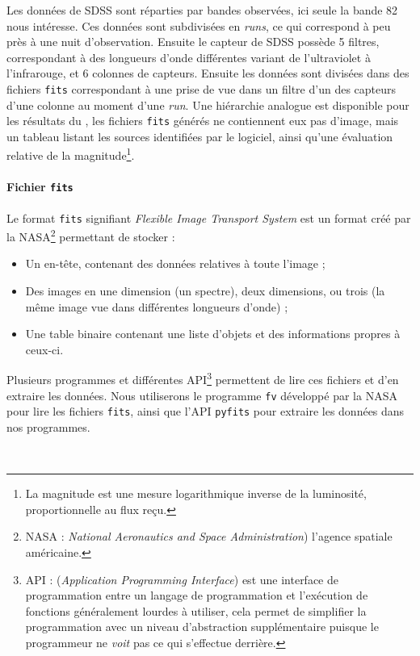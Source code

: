 Les données de SDSS sont réparties par bandes observées, ici seule la bande 82 nous intéresse. Ces données sont subdivisées en \emph{runs}, ce qui correspond à peu près à une nuit d'observation. Ensuite le capteur de SDSS possède 5 filtres, correspondant à des longueurs d'onde différentes variant de l'ultraviolet à l'infrarouge, et 6 colonnes de capteurs. Ensuite les données sont divisées dans des fichiers \texttt{fits} correspondant à une prise de vue dans un filtre d'un des capteurs d'une colonne au moment d'une \emph{run}. Une hiérarchie analogue est disponible pour les résultats du \stack{}, les fichiers \texttt{fits} générés ne contiennent eux pas d'image, mais un tableau listant les sources identifiées par le logiciel, ainsi qu'une évaluation relative de la magnitude\footnote{La magnitude est une mesure logarithmique inverse de la luminosité, proportionnelle au flux reçu.}.

			\paragraph{Fichier \texttt{fits}}
Le format \texttt{fits} signifiant \emph{Flexible Image Transport System} est un format créé par la NASA\footnote{NASA : \emph{National Aeronautics and Space Administration}) l'agence spatiale américaine.} permettant de stocker :
	\begin{itemize}
		\item Un en-tête, contenant des données relatives à toute l'image ;
		\item Des images en une dimension (un spectre), deux dimensions, ou trois (la même image vue dans différentes longueurs d'onde) ;
		\item Une table binaire contenant une liste d'objets et des informations propres à ceux-ci.
	\end{itemize}
Plusieurs programmes et différentes API\footnote{API : (\emph{Application Programming Interface}) est une interface de programmation entre un langage de programmation et l'exécution de fonctions généralement lourdes à utiliser, cela permet de simplifier la programmation avec un niveau d'abstraction supplémentaire puisque le programmeur ne \emph{voit} pas ce qui s'effectue derrière.} permettent de lire ces fichiers et d'en extraire les données. Nous utiliserons le programme \texttt{fv} développé par la NASA pour lire les fichiers \texttt{fits}, ainsi que l'API \Python{} \texttt{pyfits} pour extraire les données dans nos programmes.

\

